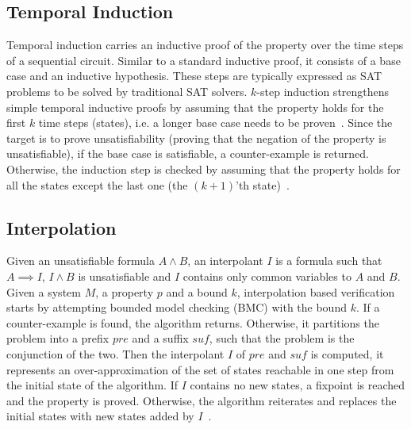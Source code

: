 \subsection{Temporal Induction}
Temporal induction carries an inductive proof of the property 
over the time steps of a sequential circuit.
Similar to a standard inductive proof, it consists of a base
case and an inductive hypothesis. These steps are typically 
expressed as SAT problems to be solved by traditional SAT solvers.  
$k$-step induction strengthens simple temporal inductive proofs 
by assuming that the property holds for the first $k$ time steps (states), 
i.e. a longer base case needs to be proven~\cite{een2003temporal}. Since the target is
to prove unsatisfiability (proving that the negation of the property 
is unsatisfiable), if the base case is satisfiable, a counter-example 
is returned. Otherwise, the induction step is checked by assuming that
the property holds for all the states except the last one (the $(k+1)$'th 
state)~\cite{biere2009handbook}.   

\subsection{Interpolation}
Given an unsatisfiable formula $A \land B$, an interpolant $I$ is
a formula such that $A \implies I$, $I \land B$ is unsatisfiable and
$I$ contains only common variables to $A$ and $B$. 
Given a system $M$, a property $p$ and a bound $k$, interpolation
based verification starts by attempting bounded model checking (BMC) with the bound $k$. 
If a counter-example is found, the algorithm returns. Otherwise, it
partitions the problem into a prefix $pre$ and a suffix $suf$, such that the 
problem is the conjunction of the two. 
Then the interpolant $I$ of $pre$ and $suf$ is computed, it represents
an over-approximation of the set of states reachable in one step from the initial state
of the algorithm. If $I$ contains no new states, a fixpoint is reached 
and the property is proved. Otherwise, the algorithm reiterates and replaces
the initial states with new states added by $I$~\cite{amla2005analysis}. 


